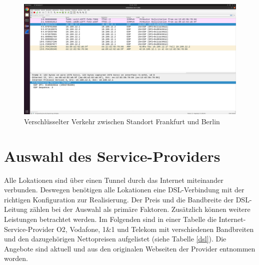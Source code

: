 \documentclass[fontsize=12pt,paper=a4,open=any,parskip=half,
  twoside=false,toc=listof,toc=bibliography,fleqn,leqno,
  captions=nooneline,captions=tableabove,british]{scrbook}
\begin{document}
\begin{figure}[H]
 \centering
 \includegraphics[width=1.0\textwidth]{Bilder/esp}
 \captionsetup{justification=centering,margin=2cm}
 \caption{Verschlüsselter Verkehr zwischen Standort Frankfurt und Berlin}
 \label{esp}
\end{figure}

\section{Auswahl des Service-Providers}
Alle Lokationen sind über einen Tunnel durch das Internet miteinander verbunden. Deswegen benötigen alle Lokationen eine DSL-Verbindung mit der richtigen Konfiguration zur Realisierung. Der Preis und die Bandbreite der DSL-Leitung zählen bei der Auswahl als primäre Faktoren. Zusätzlich können weitere Leistungen betrachtet werden. Im Folgenden sind in einer Tabelle die Internet-Service-Provider O2, Vodafone, 1\&1 und Telekom mit verschiedenen Bandbreiten und den dazugehörigen Nettopreisen aufgelistet (siehe Tabelle \ref{dsl}). Die Angebote sind aktuell und aus den originalen Webseiten der Provider entnommen worden.
\end{document}
